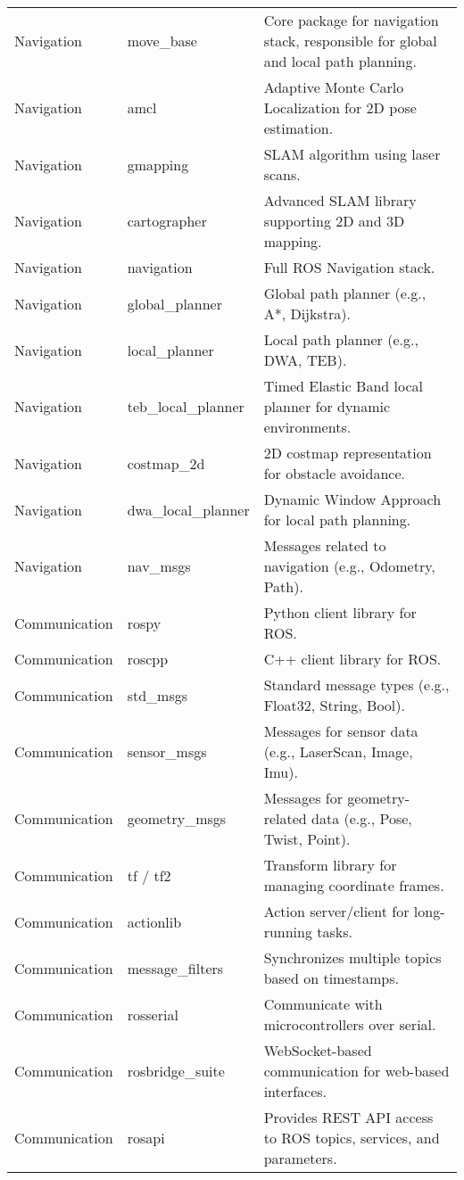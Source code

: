 \documentclass[../../main]{subfiles}
\begin{document}
\begin{longtable}{|>{\centering\arraybackslash}p{4cm}|>{\centering\arraybackslash}p{4cm}|p{6cm}|}
Navigation & move\_base & Core package for navigation stack, responsible for global and local path planning. \\
Navigation & amcl & Adaptive Monte Carlo Localization for 2D pose estimation. \\
Navigation & gmapping & SLAM algorithm using laser scans. \\
Navigation & cartographer & Advanced SLAM library supporting 2D and 3D mapping. \\
Navigation & navigation & Full ROS Navigation stack. \\
Navigation & global\_planner & Global path planner (e.g., A*, Dijkstra). \\
Navigation & local\_planner & Local path planner (e.g., DWA, TEB). \\
Navigation & teb\_local\_planner & Timed Elastic Band local planner for dynamic environments. \\
Navigation & costmap\_2d & 2D costmap representation for obstacle avoidance. \\
Navigation & dwa\_local\_planner & Dynamic Window Approach for local path planning. \\
Navigation & nav\_msgs & Messages related to navigation (e.g., Odometry, Path). \\

Communication & rospy & Python client library for ROS. \\
Communication & roscpp & C++ client library for ROS. \\
Communication & std\_msgs & Standard message types (e.g., Float32, String, Bool). \\
Communication & sensor\_msgs & Messages for sensor data (e.g., LaserScan, Image, Imu). \\
Communication & geometry\_msgs & Messages for geometry-related data (e.g., Pose, Twist, Point). \\
Communication & tf / tf2 & Transform library for managing coordinate frames. \\
Communication & actionlib & Action server/client for long-running tasks. \\
Communication & message\_filters & Synchronizes multiple topics based on timestamps. \\
Communication & rosserial & Communicate with microcontrollers over serial. \\
Communication & rosbridge\_suite & WebSocket-based communication for web-based interfaces. \\
Communication & rosapi & Provides REST API access to ROS topics, services, and parameters. \\


\end{longtable}
\end{document}
